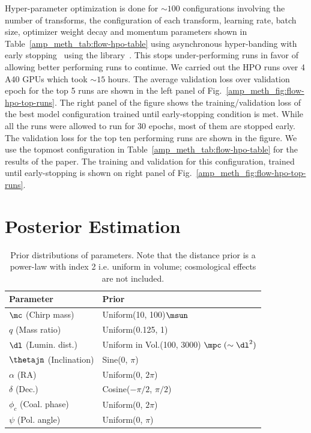\begin{refsection}
Hyper-parameter optimization is done for $\sim 100$ configurations involving the number of transforms, the configuration of each transform, learning rate, batch size, optimizer
weight decay and momentum parameters shown in Table~\ref{amp_meth_tab:flow-hpo-table} using asynchronous hyper-banding with early stopping~\cite{li2018massively} using the {\raytune} library~\cite{liaw2018tune}.
This stops under-performing runs in favor of allowing better performing runs to continue. We carried out the HPO runs over 4 A40 GPUs which took $\sim 15$ hours. 
The average validation loss over validation epoch for the top 5 runs are shown in the left panel of Fig.~\ref{amp_meth_fig:flow-hpo-top-runs}.
The right panel of the figure shows the training/validation loss of the best model configuration trained until early-stopping condition is met.
While all the runs were allowed to run for 30 epochs, most of them are stopped early. The validation loss for the top ten performing runs are shown in the figure.
We use the topmost configuration in Table~\ref{amp_meth_tab:flow-hpo-table} for the results of the paper. 
The training and validation for this configuration, trained until early-stopping is shown on right panel of Fig.~\ref{amp_meth_fig:flow-hpo-top-runs}.


\section{Posterior Estimation}
\label{amp_meth_sec:estimation}

\begin{table}
\caption[Prior distributions of parameters used to train \amplfi]{Prior distributions of parameters.
Note that the distance prior is a power-law with index 2 i.e. uniform in volume; cosmological effects are not included.}
\centering
\begin{tabular}{ll}
\hline
Parameter & Prior \\
\hline\hline
$\mc$ \hfill (Chirp mass) & Uniform(10, 100)$\msun$ \\
$q$ \hfill (Mass ratio) & Uniform(0.125, 1) \\
$\dl$ \hfill (Lumin. dist.) & Uniform in Vol.(100, 3000) $\mpc\;(\sim\dl^2)$ \\
$\thetajn$ \hfill (Inclination) & Sine(0, $\pi$) \\
$\alpha$ \hfill (RA) & Uniform(0, $2\pi$)\\
$\delta$ \hfill (Dec.) & Cosine($-\pi/2$, $\pi/2$) \\
$\phi_c$ \hfill (Coal. phase) & Uniform(0, $2\pi$) \\
$\psi$ \hfill (Pol. angle) & Uniform(0, $\pi$)\\ 
\hline
\end{tabular}
\label{amp_meth_tab:priors}
\end{table}


\end{refsection}
